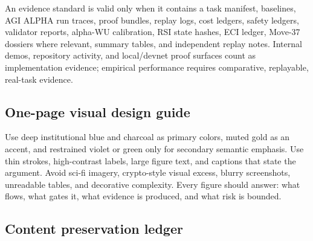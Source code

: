 \documentclass[
  11pt,
]{article}
\begin{document}
An evidence standard is valid only when it contains a task manifest,
baselines, AGI ALPHA run traces, proof bundles, replay logs, cost
ledgers, safety ledgers, validator reports, alpha-WU calibration, RSI
state hashes, ECI ledger, Move-37 dossiers where relevant, summary
tables, and independent replay notes. Internal demos, repository
activity, and local/devnet proof surfaces count as implementation
evidence; empirical performance requires comparative, replayable,
real-task evidence.

\subsection{One-page visual design
guide}\label{one-page-visual-design-guide}

Use deep institutional blue and charcoal as primary colors, muted gold
as an accent, and restrained violet or green only for secondary semantic
emphasis. Use thin strokes, high-contrast labels, large figure text, and
captions that state the argument. Avoid sci-fi imagery, crypto-style
visual excess, blurry screenshots, unreadable tables, and decorative
complexity. Every figure should answer: what flows, what gates it, what
evidence is produced, and what risk is bounded.

\subsection{Content preservation
ledger}\label{content-preservation-ledger}
\end{document}
